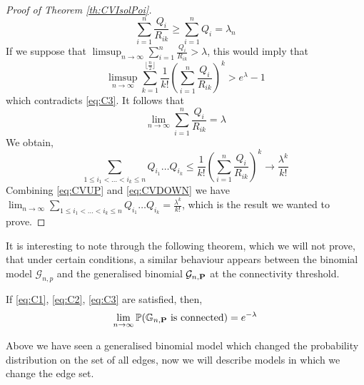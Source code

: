 \begin{proof}[Proof of Theorem \ref{th:CVIsolPoi}]
\begin{equation}
	\sum_{i=1}^n \frac{Q_i}{R_{ik}} \geq \sum_{i=1}^n Q_i = \lambda_n
	\end{equation}
	If we suppose that $\limsup_{n\to \infty} \sum_{i=1}^n \frac{Q_i}{R_{ik}} > \lambda$, 
	this would imply that
	\begin{equation}
		\limsup_{n\to \infty} \sum_{k=1}^{\lfloor \frac{n}{2}\rfloor} \frac{1}{k!} (\sum_{i=1}^n \frac{Q_i}{R_{ik}})^k > e^{\lambda} - 1
	\end{equation}
	which contradicts \eqref{eq:C3}.
	It follows that 
	\begin{equation}
		\lim_{n\to\infty} \sum_{i=1}^n \frac{Q_i}{R_{ik}} = \lambda
	\end{equation}
	We obtain, 
	\begin{equation}\label{eq:CVUP}
	\sum_{1 \leq i_1 < \ldots < i_k \leq n} Q_{i_1} \ldots Q_{i_k} \leq \frac{1}{k!} (\sum_{i=1}^n \frac{Q_i}{R_{ik}})^k \longrightarrow \frac{\lambda^k}{k!}
	\end{equation}
	Combining \eqref{eq:CVUP} and \eqref{eq:CVDOWN} we have $\lim_{n\to\infty} \sum_{1 \leq i_1 < \ldots <i_k \leq n} Q_{i_1} \ldots Q_{i_k} = \frac{\lambda^k}{k!}$, which is the result we wanted to prove.
\end{proof}
It is interesting to note through the following theorem, which we will not prove, that under certain conditions, a similar behaviour appears between the binomial model $\mathcal{G}_{n,p}$ and the generalised binomial $\mathcal{G}_{n, \bold{P}}$ at the connectivity threshold.
\begin{theorem}
	If \eqref{eq:C1}, \eqref{eq:C2}, \eqref{eq:C3} are satisfied, then,
	\begin{equation}
		\lim_{n\to \infty} \mathbb{P}(\mathbb{G}_{n, \bold{P}} \text{ is connected}) = e^{-\lambda}
	\end{equation}
\end{theorem}

Above we have seen a generalised binomial model which changed the probability distribution on the set of all edges, now we will describe models in which we change the edge set.
